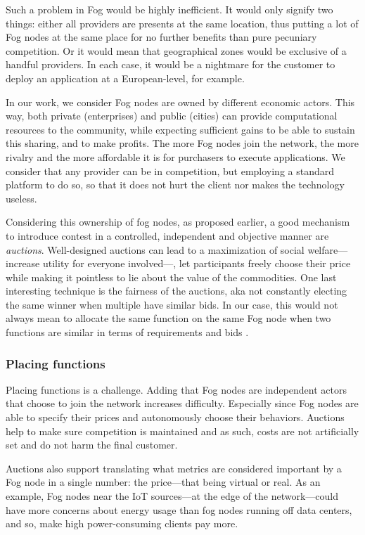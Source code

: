 Such a problem in Fog would be highly inefficient. It would only signify two things: either all providers are presents at the same location, thus putting a lot of Fog nodes at the same place for no further benefits than pure pecuniary competition. Or it would mean that geographical zones would be exclusive of a handful providers. In each case, it would be a nightmare for the customer to deploy an application at a European-level, for example.

In our work, we consider Fog nodes are owned by different economic actors. This way, both private (enterprises) and public (cities) can provide computational resources to the community, while expecting sufficient gains to be able to sustain this sharing, and to make profits. The more Fog nodes join the network, the more rivalry and the more affordable it is for purchasers to execute applications. We consider that any provider can be in competition, but employing a standard platform to do so, so that it does not hurt the client nor makes the technology useless.

Considering this ownership of fog nodes, as proposed earlier, a good mechanism to introduce contest in a controlled, independent and objective manner are \emph{auctions}. Well-designed auctions can lead to a maximization of social welfare—increase utility for everyone involved—, let participants freely choose their price while making it pointless to lie about the value of the commodities. One last interesting technique is the fairness of the auctions, aka not constantly electing the same winner when multiple have similar bids. In our case, this would not always mean to allocate the same function on the same Fog node when two functions are similar in terms of requirements and bids \cite{kuo_proportionnet_2020}.

\subsubsection{Placing functions}

Placing functions is a challenge. Adding that Fog nodes are independent actors that choose to join the network increases difficulty. Especially since Fog nodes are able to specify their prices and autonomously choose their behaviors. Auctions help to make sure competition is maintained and as such, costs are not artificially set and do not harm the final customer.

Auctions also support translating what metrics are considered important by a Fog node in a single number: the price—that being virtual or real. As an example, Fog nodes near the \gls{IoT} sources—at the edge of the network—could have more concerns about energy usage than fog nodes running off data centers, and so, make high power-consuming clients pay more.

